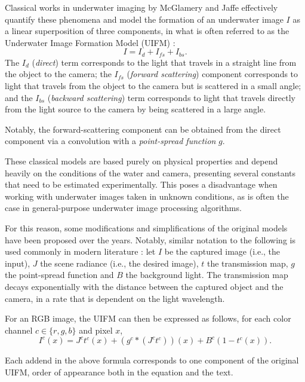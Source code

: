 \documentclass[twocolumn,twoside,a4paper,10pt]{IEEEtran}
\begin{document}
Classical works in underwater imaging by McGlamery \cite{10.1117/12.958279} and Jaffe \cite{50695} effectively quantify these phenomena and model the formation of an underwater image \(I\) as a linear superposition of three components, in what is often referred to as the Underwater Image Formation Model (UIFM) \cite{xie2021variational}:
\[
  I = I_{d} + I_{fs} + I_{bs}
.\]
The \(I_d\) (\textit{direct}) term corresponds to the light that travels in a straight line from the object to the camera; the \(I_{fs}\) (\textit{forward scattering}) component corresponds to light that travels from the object to the camera but is scattered in a small angle; and the \(I_{bs}\) (\textit{backward scattering}) term corresponds to light that travels directly from the light source to the camera by being scattered in a large angle.

Notably, the forward-scattering component can be obtained from the direct component via a convolution with a \textit{point-spread function} \(g\).

These classical models are based purely on physical properties and depend heavily on the
conditions of the water and camera, presenting several constants that need to be
estimated experimentally. This poses a disadvantage when working with
underwater images taken in unknown conditions, as is often the case in
general-purpose underwater image processing algorithms.

For this reason, some modifications and simplifications of the original models
have been proposed over the years. Notably, similar notation to the following is used commonly in modern literature \cite{xie2021variational,ancuti2017color}: let \(I\) be the captured image (i.e., the input), \(J\) the scene radiance (i.e., the desired image), \(t\) the transmission map, \(g\) the point-spread function and \(B\) the background light. The transmission map decays exponentially with the distance between the captured object and the camera, in a rate that is dependent on the light wavelength.

For an RGB image, the UIFM can then be expressed as follows, for each color channel \(c\in\{r, g, b\}\) and pixel \(x\),
\begin{equation}\label{eq:uifm}
  I^c(x) = J^ct^c(x) + \left(g^c\ast\left(J^c t^c\right)\right) (x) +  B^c\left(1 - t^c(x)\right).
\end{equation}

Each addend in the above formula corresponds to one component of the original UIFM, order of appearance both in the equation and the text.
\end{document}
